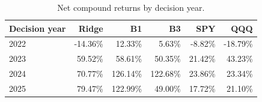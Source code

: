 \begin{table}[H]
\centering
\begin{tabular}{lrrrrr}
\toprule
Decision year & Ridge & B1 & B3 & SPY & QQQ \\
\midrule
2022 & -14.36\% & 12.33\% & 5.63\% & -8.82\% & -18.79\% \\
2023 & 59.52\% & 58.61\% & 50.35\% & 21.42\% & 43.23\% \\
2024 & 70.77\% & 126.14\% & 122.68\% & 23.86\% & 23.34\% \\
2025 & 79.47\% & 122.99\% & 49.00\% & 17.72\% & 21.10\% \\
\bottomrule
\end{tabular}
\caption{Net compound returns by decision year.}
\label{tab:annual}
\end{table}
